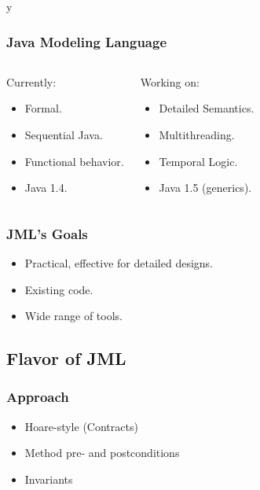 \if y\MAKEHANDOUTS \documentclass[compress,landscape,handout]{beamer}
\begin{document}
\begin{frame}
\frametitle{Java Modeling Language}
\begin{columns}[t]
\begin{block}{Currently:}
\begin{itemize}
\item
Formal.

\item 
Sequential Java.

\item
Functional behavior.

\item
Java 1.4.
\end{itemize}
\end{block}

\pause

\begin{block}{Working on:}
\begin{itemize}
\item
Detailed Semantics.

\item 
Multithreading.

\item
Temporal Logic.

\item
Java 1.5 (generics).
\end{itemize}
\end{block}
\end{columns}
\end{frame}

\begin{frame}
\frametitle{JML's Goals}
\begin{itemize}
\item
Practical, effective for detailed designs.

\item
Existing code.

\item
Wide range of tools.
\end{itemize}
\end{frame}

\subsection[Flavor]{Flavor of JML}

\begin{frame}
\frametitle{Approach}
\begin{itemize}
\item
Hoare-style (Contracts)

\item
Method pre- and postconditions 

\item
Invariants
\end{itemize}
\end{frame}
\end{document}
